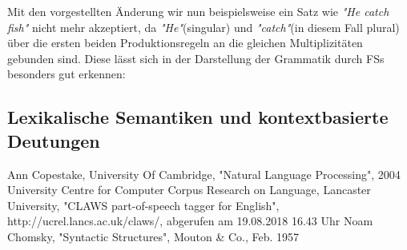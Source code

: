 \documentclass[12pt]{paper}
\begin{document}
Mit den vorgestellten Änderung wir nun beispielsweise ein Satz wie \textit{"He catch fish"} nicht mehr akzeptiert, da \textit{"He"}(singular) und \textit{"catch"}(in diesem Fall plural) über die ersten beiden Produktionsregeln an die gleichen Multiplizitäten gebunden sind. 
Diese lässt sich in der Darstellung der Grammatik durch FSs besonders gut erkennen:



\subsection{Lexikalische Semantiken und kontextbasierte Deutungen}

\newpage

\begin{thebibliography}{5}
Ann Copestake, University Of Cambridge, "Natural Language Processing", 2004
University Centre for Computer Corpus Research on Language, Lancaster University, "CLAWS part-of-speech tagger for English", http://ucrel.lancs.ac.uk/claws/, abgerufen am 19.08.2018 16.43 Uhr
 Noam Chomsky, "Syntactic Structures", Mouton \& Co., Feb. 1957

\end{thebibliography}
\end{document}
